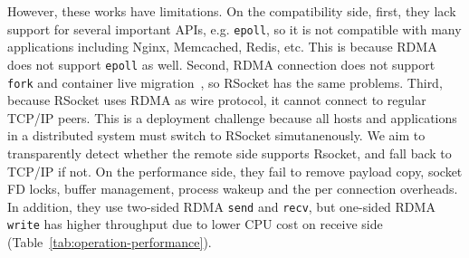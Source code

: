 However, these works have limitations.
On the compatibility side, first, they lack support for several important APIs, e.g. \texttt{epoll}, so it is not compatible with many applications including Nginx, Memcached, Redis, etc.
This is because RDMA does not support \texttt{epoll} as well.
Second, RDMA connection does not support \texttt{fork} and container live migration~\cite{nsdi19freeflow}, so RSocket has the same problems.
Third, because RSocket uses RDMA as wire protocol, it cannot connect to regular TCP/IP peers.
This is a deployment challenge because all hosts and applications in a distributed system must switch to RSocket simutanenously.
We aim to transparently detect whether the remote side supports Rsocket, and fall back to TCP/IP if not.
On the performance side, they fail to remove payload copy, socket FD locks, buffer management, process wakeup and the per connection overheads.
In addition, they use two-sided RDMA \texttt{send} and \texttt{recv}, but one-sided RDMA \texttt{write} has higher throughput due to lower CPU cost on receive side (Table~\ref{tab:operation-performance}).




